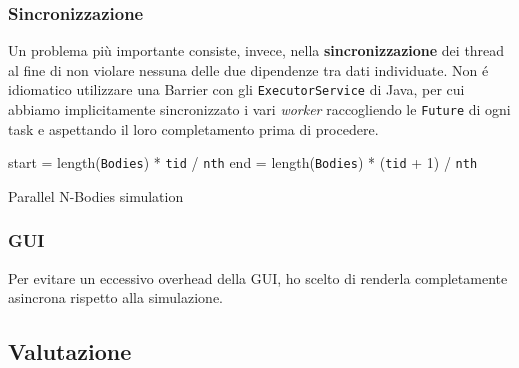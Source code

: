 \documentclass[report]{subfiles}
\begin{document}
	\subsubsection{Sincronizzazione}
	Un problema più importante consiste, invece, nella \textbf{sincronizzazione} dei thread al fine di non violare nessuna delle due dipendenze tra dati individuate. Non \'e idiomatico utilizzare una Barrier con gli \texttt{ExecutorService} di Java, per cui abbiamo implicitamente sincronizzato i vari \textit{worker} raccogliendo le \texttt{Future} di ogni task e aspettando il loro completamento prima di procedere.
	
	\begin{algorithm}
		
		start = length(\texttt{Bodies}) * \texttt{tid} / \texttt{nth}\;
		end = length(\texttt{Bodies}) * (\texttt{tid} + 1) / \texttt{nth}\;
		\caption{Parallel N-Bodies simulation}
		\label{alg:sim-barrier}
	\end{algorithm}
	
	\subsubsection{GUI}
	Per evitare un eccessivo overhead della GUI, ho scelto di renderla completamente asincrona rispetto alla simulazione.
	
	\subsection{Valutazione}
\end{document}
